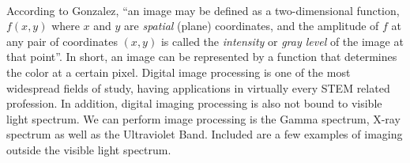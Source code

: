\documentclass{amsproc}
\begin{document}
\mbox{}	 \\
\indent According to Gonzalez, ``an image may be defined as a two-dimensional function, $f(x, y)$ where $x$ and $y$ are \textit{spatial} (plane) coordinates, and the amplitude of $f$ at any pair of coordinates $(x, y)$ is called the \textit{intensity} or \textit{gray level} of the image at that point''. In short, an image can be represented by a function that determines the color at a certain pixel. Digital image processing is one of the most widespread fields of study, having applications in virtually every STEM related profession. In addition, digital imaging processing is also not bound to visible light spectrum. We can perform image processing is the Gamma spectrum, X-ray spectrum as well as the Ultraviolet Band. Included are a few examples of imaging outside the visible light spectrum.
\end{document}
